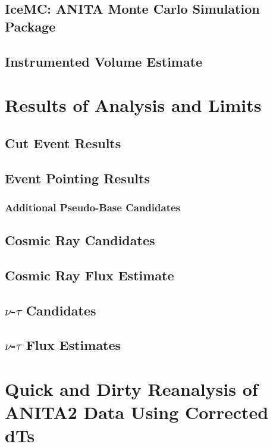 \section{IceMC: ANITA Monte Carlo Simulation Package}
	
\section{Instrumented Volume Estimate}
			
			
\chapter{Results of Analysis and Limits}
\section{Cut Event Results}

\section{Event Pointing Results}
	\subsection{Additional Pseudo-Base Candidates}


\section{Cosmic Ray Candidates}

\section{Cosmic Ray Flux Estimate}

\section{$\nu$-$\tau$ Candidates}

\section{$\nu$-$\tau$ Flux Estimates}

			
\chapter{Quick and Dirty Reanalysis of ANITA2 Data Using Corrected dTs}

